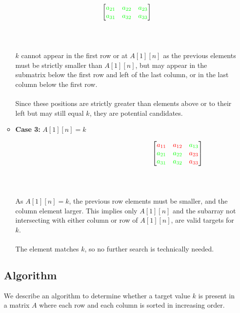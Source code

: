 \documentclass[12pt]{article}
\begin{document}
\begin{enumerate}
\begin{itemize}
\begin{varwidth}{\textwidth}
\[\begin{bmatrix}
        \textcolor{green}{a_{21}} & \textcolor{green}{a_{22}} & \textcolor{green}{a_{23}} \\
        \textcolor{green}{a_{31}} & \textcolor{green}{a_{32}} & \textcolor{green}{a_{33}}
        \end{bmatrix}
        \] \\
        \end{varwidth}
        \\ 
        $k$ cannot appear in the first row or at $A[1][n]$ as the previous elements must be strictly smaller than $A[1][n]$, but may appear in the submatrix below the first row and left of the last column, or in the last column below the first row.  
        \\\\ Since these positions are strictly greater than elements above or to their left but may still equal $k$, they are potential candidates.
        \item \textbf{Case 3:} $A[1][n] = k$ \\
        \begin{varwidth}{\textwidth}
        \[ \hspace{15em}
        \begin{bmatrix}
        \textcolor{red}{a_{11}} & \textcolor{red}{a_{12}} & \textcolor{green}{a_{13}} \\
        \textcolor{green}{a_{21}} & \textcolor{green}{a_{22}} & \textcolor{red}{a_{23}} \\
        \textcolor{green}{a_{31}} & \textcolor{green}{a_{32}} & \textcolor{red}{a_{33}}
        \end{bmatrix}
        \] \\
        \end{varwidth}
        \\ 
        As $A[1][n] = k$, the previous row elements must be smaller, and the column element larger. This implies only $A[1][n]$ and the subarray not intersecting with either column or row of $A[1][n]$, are valid targets for $k$.
        \\\\ The element matches $k$, so no further search is technically needed. \newpage
    \end{itemize} 

\subsection*{Algorithm}

We describe an algorithm to determine whether a target value \(k\) is present in a matrix \(A\) where each row and each column is sorted in increasing order.


\end{enumerate}
\end{document}
